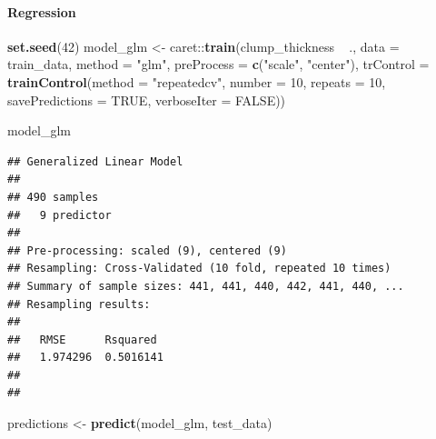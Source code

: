 \documentclass[]{article}
\newenvironment{Shaded}{\begin{snugshade}}{\end{snugshade}}
\newcommand{\KeywordTok}[1]{\textcolor[rgb]{0.13,0.29,0.53}{\textbf{{#1}}}}
\newcommand{\DataTypeTok}[1]{\textcolor[rgb]{0.13,0.29,0.53}{{#1}}}
\newcommand{\DecValTok}[1]{\textcolor[rgb]{0.00,0.00,0.81}{{#1}}}
\newcommand{\StringTok}[1]{\textcolor[rgb]{0.31,0.60,0.02}{{#1}}}
\newcommand{\OtherTok}[1]{\textcolor[rgb]{0.56,0.35,0.01}{{#1}}}
\newcommand{\NormalTok}[1]{{#1}}
\let\oldparagraph\paragraph
\renewcommand{\paragraph}[1]{\oldparagraph{#1}\mbox{}}
\begin{document}
\paragraph{Regression}\label{regression}

\begin{Shaded}
\begin{Highlighting}[]
\KeywordTok{set.seed}\NormalTok{(}\DecValTok{42}\NormalTok{)}
\NormalTok{model_glm <-}\StringTok{ }\NormalTok{caret::}\KeywordTok{train}\NormalTok{(clump_thickness ~}\StringTok{ }\NormalTok{.,}
                          \DataTypeTok{data =} \NormalTok{train_data,}
                          \DataTypeTok{method =} \StringTok{"glm"}\NormalTok{,}
                          \DataTypeTok{preProcess =} \KeywordTok{c}\NormalTok{(}\StringTok{"scale"}\NormalTok{, }\StringTok{"center"}\NormalTok{),}
                          \DataTypeTok{trControl =} \KeywordTok{trainControl}\NormalTok{(}\DataTypeTok{method =} \StringTok{"repeatedcv"}\NormalTok{, }
                                                  \DataTypeTok{number =} \DecValTok{10}\NormalTok{, }
                                                  \DataTypeTok{repeats =} \DecValTok{10}\NormalTok{, }
                                                  \DataTypeTok{savePredictions =} \OtherTok{TRUE}\NormalTok{, }
                                                  \DataTypeTok{verboseIter =} \OtherTok{FALSE}\NormalTok{))}
\end{Highlighting}
\end{Shaded}

\begin{Shaded}
\begin{Highlighting}[]
\NormalTok{model_glm}
\end{Highlighting}
\end{Shaded}

\begin{verbatim}
## Generalized Linear Model 
## 
## 490 samples
##   9 predictor
## 
## Pre-processing: scaled (9), centered (9) 
## Resampling: Cross-Validated (10 fold, repeated 10 times) 
## Summary of sample sizes: 441, 441, 440, 442, 441, 440, ... 
## Resampling results:
## 
##   RMSE      Rsquared 
##   1.974296  0.5016141
## 
## 
\end{verbatim}

\begin{Shaded}
\begin{Highlighting}[]
\NormalTok{predictions <-}\StringTok{ }\KeywordTok{predict}\NormalTok{(model_glm, test_data)}
\end{Highlighting}
\end{Shaded}
\end{document}
